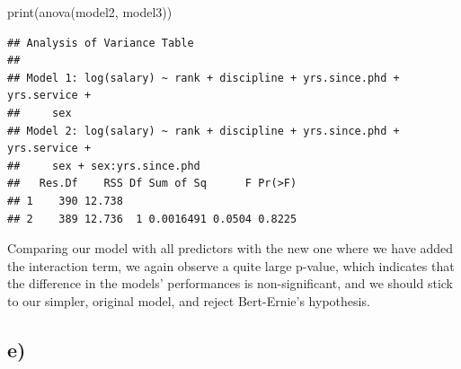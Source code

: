 \documentclass[
]{article}
\newenvironment{Shaded}{\begin{snugshade}}{\end{snugshade}}
\newcommand{\FunctionTok}[1]{\textcolor[rgb]{0.00,0.00,0.00}{#1}}
\newcommand{\NormalTok}[1]{#1}
\begin{document}
\begin{Shaded}
\begin{Highlighting}[]
\FunctionTok{print}\NormalTok{(}\FunctionTok{anova}\NormalTok{(model2, model3))}
\end{Highlighting}
\end{Shaded}

\begin{verbatim}
## Analysis of Variance Table
## 
## Model 1: log(salary) ~ rank + discipline + yrs.since.phd + yrs.service + 
##     sex
## Model 2: log(salary) ~ rank + discipline + yrs.since.phd + yrs.service + 
##     sex + sex:yrs.since.phd
##   Res.Df    RSS Df Sum of Sq      F Pr(>F)
## 1    390 12.738                           
## 2    389 12.736  1 0.0016491 0.0504 0.8225
\end{verbatim}

Comparing our model with all predictors with the new one where we have
added the interaction term, we again observe a quite large p-value,
which indicates that the difference in the models' performances is
non-significant, and we should stick to our simpler, original model, and
reject Bert-Ernie's hypothesis.

\hypertarget{e}{%
\subsection{e)}\label{e}}
\end{document}
